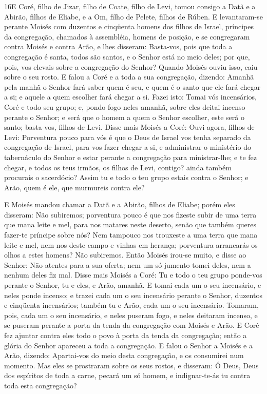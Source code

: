 \medskip

\lettrine{16} E Coré, filho de Jizar, filho de Coate, filho de
Levi, tomou consigo a Datã e a Abirão, filhos de Eliabe, e a Om,
filho de Pelete, filhos de Rúben. E levantaram-se perante Moisés
com duzentos e cinqüenta homens dos filhos de Israel, príncipes da
congregação, chamados à assembléia, homens de posição, e se
congregaram contra Moisés e contra Arão, e lhes disseram: Basta-vos,
pois que toda a congregação é santa, todos são santos, e o Senhor
está no meio deles; por que, pois, vos elevais sobre a congregação
do Senhor? Quando Moisés ouviu isso, caiu sobre o seu rosto.
E falou a Coré e a toda a sua congregação, dizendo: Amanhã pela
manhã o Senhor fará saber quem é seu, e quem é o santo que ele fará
chegar a si; e aquele a quem escolher fará chegar a si. Fazei
isto: Tomai vós incensários, Coré e todo seu grupo; e, pondo
fogo neles amanhã, sobre eles deitai incenso perante o Senhor; e
será que o homem a quem o Senhor escolher, este será o santo;
basta-vos, filhos de Levi. Disse mais Moisés a Coré: Ouvi agora,
filhos de Levi: Porventura pouco para vós é que o Deus de Israel
vos tenha separado da congregação de Israel, para vos fazer chegar a
si, e administrar o ministério do tabernáculo do Senhor e estar
perante a congregação para ministrar-lhe; e te fez chegar, e
todos os teus irmãos, os filhos de Levi, contigo? ainda também
procurais o sacerdócio? Assim tu e todo o teu grupo estais
contra o Senhor; e Arão, quem é ele, que murmureis contra ele?

E Moisés mandou chamar a Datã e a Abirão, filhos de Eliabe; porém
eles disseram: Não subiremos; porventura pouco é que nos
fizeste subir de uma terra que mana leite e mel, para nos matares
neste deserto, senão que também queres fazer-te príncipe sobre nós?
Nem tampouco nos trouxeste a uma terra que mana leite e mel,
nem nos deste campo e vinhas em herança; porventura arrancarás os
olhos a estes homens? Não subiremos. Então Moisés irou-se
muito, e disse ao Senhor: Não atentes para a sua oferta; nem um só
jumento tomei deles, nem a nenhum deles fiz mal. Disse mais
Moisés a Coré: Tu e todo o teu grupo ponde-vos perante o Senhor, tu
e eles, e Arão, amanhã. E tomai cada um o seu incensário, e
neles ponde incenso; e trazei cada um o seu incensário perante o
Senhor, duzentos e cinqüenta incensários; também tu e Arão, cada um
o seu incensário. Tomaram, pois, cada um o seu incensário, e
neles puseram fogo, e neles deitaram incenso, e se puseram perante a
porta da tenda da congregação com Moisés e Arão. E Coré fez
ajuntar contra eles todo o povo à porta da tenda da congregação;
então a glória do Senhor apareceu a toda a congregação. E
falou o Senhor a Moisés e a Arão, dizendo: Apartai-vos do
meio desta congregação, e os consumirei num momento. Mas eles
se prostraram sobre os seus rostos, e disseram: Ó Deus, Deus dos
espíritos de toda a carne, pecará um só homem, e indignar-te-ás tu
contra toda esta congregação?

